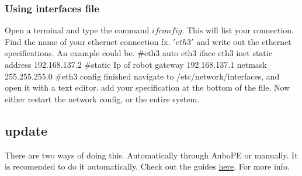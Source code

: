 \documentclass{article}
\begin{document}
\subsubsection{Using interfaces file}
Open a terminal and type the command $ifconfig$. 
This will list your connection. Find the name of your ethernet connection fx. $'eth3'$ and write out the ethernet specifications. An example could be. 
\#eth3
auto eth3 
iface eth3 inet static 
address 192.168.137.2 \#static Ip of robot
gateway 192.168.137.1 
netmask 255.255.255.0  
\#eth3 config finished
navigate to /etc/network/interfaces, and open it with a text editor. 
add your specification at the bottom of the file.
Now either restart the network config, or the entire system.

\subsection{update}
There are two ways of doing this. Automatically through AuboPE or manually.
It is recomended to do it automatically. 
Check out the guides \href{https://drive.google.com/drive/folders/1e2sAyCd5S1s4jH7FRyMwZzTy7VTZb2NE}{here}. For more info. 
\end{document}

